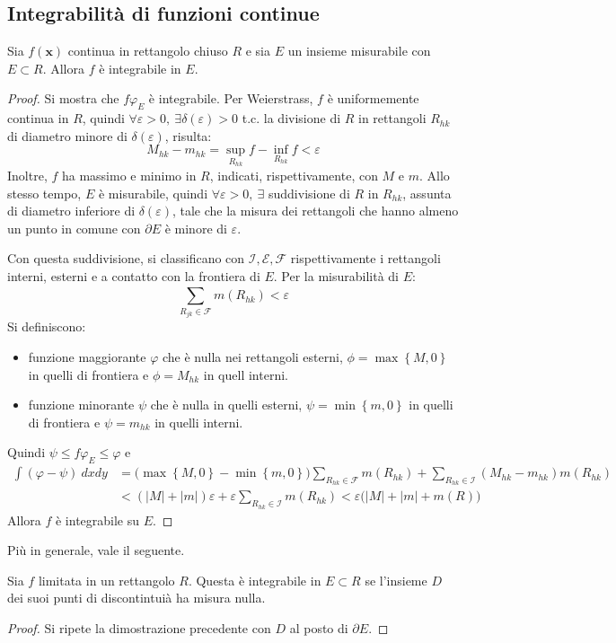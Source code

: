 \documentclass[11pt, a4paper]{scrartcl}
\theoremstyle{definition}
\numberwithin{esempio}{section}
\theoremstyle{definition}
\numberwithin{obs}{section}
\numberwithin{nota}{section}
\numberwithin{equation}{subsection}
\begin{document}
\subsection{Integrabilit\`a di funzioni continue}
\begin{teorema}
	{}{}
	Sia $f(\mathbf{x} )$ continua in rettangolo chiuso $R$ e sia $E$ un insieme misurabile con $E \subset R$. Allora $f$ \`e integrabile in $E$.
	\begin{proof}
	Si mostra che $f \varphi _E$ \`e integrabile. 
	Per Weierstrass, $f$ \`e uniformemente continua in $R$, quindi $\forall \varepsilon >0, \ \exists \delta (\varepsilon )>0$ t.c. la divisione di $R$ in rettangoli $R_{hk} $ di diametro minore di $\delta (\varepsilon )$, risulta:
	\[
	M_{hk } - m_{hk}  = \sup_{R_{hk} } f - \inf_{R_{hk} } f < \varepsilon 
	\] 
Inoltre, $f$ ha massimo e minimo in $R$, indicati, rispettivamente, con $M$ e $m$. 
Allo stesso tempo, $E$ \`e misurabile, quindi $\forall \varepsilon >0, \ \exists $ suddivisione di $R$ in $R_{hk} $, assunta di diametro inferiore di $\delta (\varepsilon )$, tale che la misura dei rettangoli che hanno almeno un punto in comune con $\partial E$ \`e minore di $\varepsilon $.

Con questa suddivisione, si classificano con $\mathcal{I}, \mathcal{E}, \mathcal{F}$ rispettivamente i rettangoli interni, esterni e a contatto con la frontiera di $E$. Per la misurabilit\`a di $E$:
\[
\sum_{R_{jk} \in \mathcal{F}}^{} m(R_{hk} ) < \varepsilon 
\] 
Si definiscono:
\begin{itemize}
	\item funzione maggiorante $\varphi  $ che \`e nulla nei rettangoli esterni, $\phi = \max\left\{ M,0 \right\} $ in quelli di frontiera e $\phi = M_{hk} $ in quell interni.
	\item funzione minorante $\psi $ che \`e nulla in quelli esterni, $\psi = \min\left\{ m , 0 \right\} $ in quelli di frontiera e $\psi  = m_{hk} $ in quelli interni.
\end{itemize}
Quindi $\psi \le f\varphi  _E \le \varphi $ e
\[
\begin{split}
	\int (\varphi-\psi )  \ dx dy&= \big(\max \left\{ M,0 \right\} - \min \left\{ m,0 \right\} \big) \sum_{R_{hk} \in \mathcal{F}}^{} m(R_{hk}) + \sum_{R_{hk} \in \mathcal{I}}^{} (M_{hk} -m_{hk} ) m(R_{hk}) \\
						   &< \left(\lvert M \rvert +\lvert m \rvert \right) \varepsilon  + \varepsilon \sum_{R_{hk} \in \mathcal{I}}^{} m(R_{hk} ) < \varepsilon \big(\lvert M \rvert +\lvert m \rvert +m(R)\big) 
\end{split}
\] 
Allora $f$ \`e integrabile su $E$.
\end{proof}
\end{teorema}
\noindent Pi\`u in generale, vale il seguente.
\begin{teorema}
	{}{}
	Sia $f$ limitata in un rettangolo $R$. Questa \`e integrabile in $E\subset R$ se l'insieme $D$ dei suoi punti di discontintui\`a ha misura nulla.
	\begin{proof}
		Si ripete la dimostrazione precedente con $D$ al posto di $\partial E$.
	\end{proof}
\end{teorema}
\end{document}
